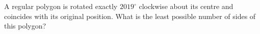 A regular polygon is rotated exactly $2019^\circ$ clockwise about its centre and coincides with its original position. What is the least possible number of sides of this polygon?
